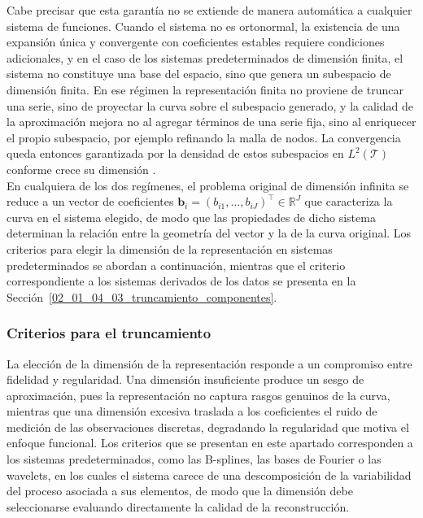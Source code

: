 Cabe precisar que esta garantía no se extiende de manera automática a cualquier sistema de funciones. Cuando el sistema no es ortonormal, la existencia de una expansión única y convergente con coeficientes estables requiere condiciones adicionales, y en el caso de los sistemas predeterminados de dimensión finita, el sistema no constituye una base del espacio, sino que genera un subespacio de dimensión finita. En ese régimen la representación finita no proviene de truncar una serie, sino de proyectar la curva sobre el subespacio generado, y la calidad de la aproximación mejora no al agregar términos de una serie fija, sino al enriquecer el propio subespacio, por ejemplo refinando la malla de nodos. La convergencia queda entonces garantizada por la densidad de estos subespacios en $L^2(\mathcal{T})$ conforme crece su dimensión \citep{02_01_deboor2001practical}.\\

En cualquiera de los dos regímenes, el problema original de dimensión infinita se reduce a un vector de coeficientes $\mathbf{b}_i = (b_{i1}, \dots, b_{iJ})^\top \in \mathbb{R}^J$ que caracteriza la curva en el sistema elegido, de modo que las propiedades de dicho sistema determinan la relación entre la geometría del vector y la de la curva original. Los criterios para elegir la dimensión de la representación en sistemas predeterminados se abordan a continuación, mientras que el criterio correspondiente a los sistemas derivados de los datos se presenta en la Sección~\ref{02_01_04_03_truncamiento_componentes}.

\subsubsection{Criterios para el truncamiento}
\label{02_01_01_01_criterios_truncamiento_representacion}
La elección de la dimensión de la representación responde a un compromiso entre fidelidad y regularidad. Una dimensión insuficiente produce un sesgo de aproximación, pues la representación no captura rasgos genuinos de la curva, mientras que una dimensión excesiva traslada a los coeficientes el ruido de medición de las observaciones discretas, degradando la regularidad que motiva el enfoque funcional. Los criterios que se presentan en este apartado corresponden a los sistemas predeterminados, como las B-splines, las bases de Fourier o las wavelets, en los cuales el sistema carece de una descomposición de la variabilidad del proceso asociada a sus elementos, de modo que la dimensión debe seleccionarse evaluando directamente la calidad de la reconstrucción.\\

